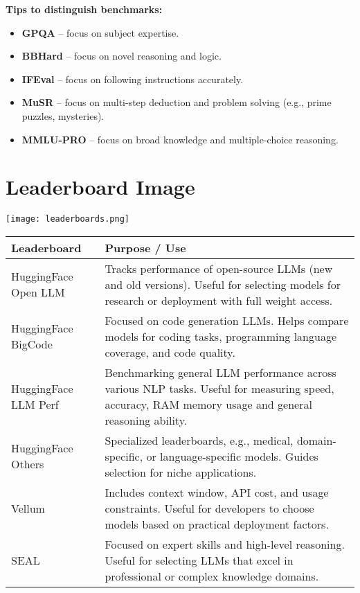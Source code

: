 \vspace{0.5em}
\textbf{Tips to distinguish benchmarks:}
\begin{itemize}
    \item \textbf{GPQA} -- focus on subject expertise.
    \item \textbf{BBHard} -- focus on novel reasoning and logic.
    \item \textbf{IFEval} -- focus on following instructions accurately.
    \item \textbf{MuSR} -- focus on multi-step deduction and problem solving (e.g., prime puzzles, mysteries).
    \item \textbf{MMLU-PRO} -- focus on broad knowledge and multiple-choice reasoning.
\end{itemize}


\section{Leaderboard Image}

\begin{center}
\texttt{[image: leaderboards.png]}
\end{center}

\begin{tabularx}{\textwidth}{|>{\hsize}L|>{\hsize}L|}
\hline
\textbf{Leaderboard} & \textbf{Purpose / Use} \\
\hline
HuggingFace Open LLM & Tracks performance of open-source LLMs (new and old versions). Useful for selecting models for research or deployment with full weight access. \\
\hline
HuggingFace BigCode & Focused on code generation LLMs. Helps compare models for coding tasks, programming language coverage, and code quality. \\
\hline
HuggingFace LLM Perf & Benchmarking general LLM performance across various NLP tasks. Useful for measuring speed, accuracy, RAM memory usage and general reasoning ability. \\
\hline
HuggingFace Others & Specialized leaderboards, e.g., medical, domain-specific, or language-specific models. Guides selection for niche applications. \\
\hline
Vellum & Includes context window, API cost, and usage constraints. Useful for developers to choose models based on practical deployment factors. \\
\hline
SEAL & Focused on expert skills and high-level reasoning. Useful for selecting LLMs that excel in professional or complex knowledge domains. \\
\hline
\end{tabularx}

